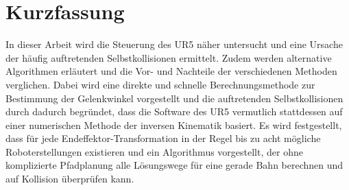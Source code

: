 \chapter*{Kurzfassung}


In dieser Arbeit wird die Steuerung des UR5 näher untersucht und eine Ursache der häufig auftretenden Selbstkollisionen ermittelt.
Zudem werden alternative Algorithmen erläutert und die Vor- und Nachteile der verschiedenen Methoden verglichen.
Dabei wird eine direkte und schnelle Berechnungsmethode zur Bestimmung der Gelenkwinkel vorgestellt und die auftretenden Selbstkollisionen durch dadurch begründet, dass die Software des UR5 vermutlich stattdessen auf einer numerischen Methode der inversen Kinematik basiert.
Es wird festgestellt, dass für jede Endeffektor-Transformation in der Regel bis zu acht mögliche Roboterstellungen existieren und ein Algorithmus vorgestellt,
der ohne komplizierte Pfadplanung alle Lösungswege für eine gerade Bahn berechnen und auf Kollision überprüfen kann.